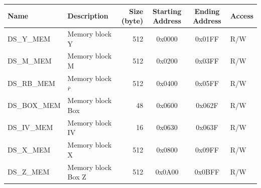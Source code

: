 \begin{longtable}{ | l | l | r | c | c | l | }
\hline
\rowcolor{lightgray}
\textbf{Name} & \textbf{Description}  &  \textbf{Size (byte)}  &  \textbf{Starting Address}  &  \textbf{Ending Address}  & \textbf{Access}   \\ \hline
DS\_Y\_MEM\label{DSYMEM} & Memory block Y  & 512  & 0x0000 & 0x01FF & R/W \\ \hline
DS\_M\_MEM\label{DSMMEM} & Memory block M & 512  & 0x0200 & 0x03FF & R/W \\ \hline
DS\_RB\_MEM\label{DSRBMEM} & Memory block $\overline{r}$  & 512  & 0x0400 & 0x05FF & R/W \\ \hline
DS\_BOX\_MEM\label{DSBOXMEM} & Memory block Box  & 48  & 0x0600 & 0x062F & R/W \\ \hline
DS\_IV\_MEM\label{DSIVMEM} & Memory block IV  & 16  & 0x0630 & 0x063F & R/W \\ \hline
DS\_X\_MEM\label{DSXMEM} & Memory block X  & 512  & 0x0800 & 0x09FF & R/W \\ \hline
DS\_Z\_MEM\label{DSZMEM} & Memory block Box Z  & 512  & 0x0A00 & 0x0BFF & R/W \\ \hline
\end{longtable}
